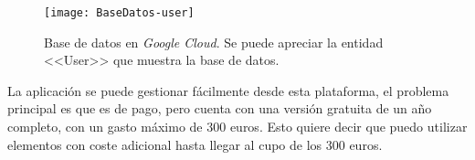 \begin{figure}[h]
\centering
\texttt{[image: BaseDatos-user]}
\caption{Base de datos en \emph{Google Cloud}. Se puede apreciar la entidad <<User>> que muestra la base de datos.}
\label{fig:4.1}
\end{figure}

La aplicación se puede gestionar fácilmente desde esta plataforma, el problema principal es que es de pago, pero cuenta con una versión gratuita de un año completo, con un gasto máximo de 300 euros. Esto quiere decir que puedo utilizar elementos con coste adicional hasta llegar al cupo de los 300 euros. 
